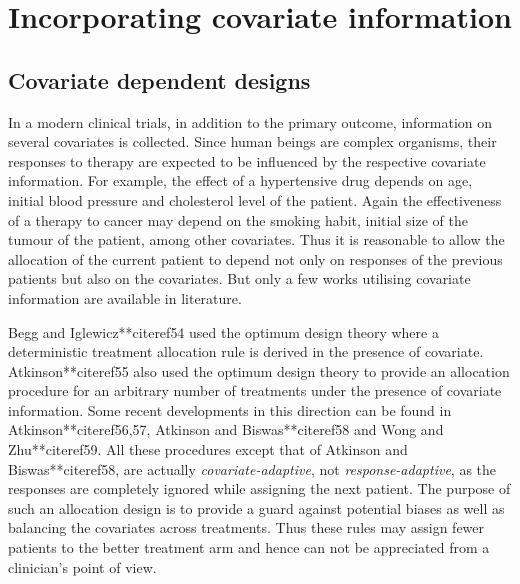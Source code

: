 \section{Incorporating covariate information}

\subsection{Covariate dependent designs}

In a modern clinical trials, in addition to the primary
outcome, information on several covariates is collected. Since human
beings are complex organisms, their responses to therapy are
expected to be influenced by the respective covariate information.
For example, the effect of a hypertensive drug depends on age,
initial blood pressure and cholesterol level of the patient. Again
the effectiveness of a therapy to cancer may depend on the smoking
habit, initial size of the tumour of the patient, among other covariates. Thus it is reasonable to allow the allocation
of the current patient to depend not only on responses of the
previous patients but also on the covariates. But only a few works
utilising covariate information are available in literature.

Begg and Iglewicz**citeref{54} used the optimum design theory where a deterministic treatment allocation rule is derived in the
presence of covariate. Atkinson**citeref{55} also used the optimum design
theory to provide an allocation procedure for an arbitrary number of
treatments under the presence of covariate information. Some recent
developments in this direction can be found in Atkinson**citeref{56,57}, Atkinson and Biswas**citeref{58} and Wong and Zhu**citeref{59}. All these procedures except that of Atkinson and Biswas**citeref{58}, are actually \textit{covariate-adaptive}, not \textit{response-adaptive}, as
the responses are completely ignored while assigning the next
patient. The purpose of such an allocation design is to provide a
guard against potential biases as well as balancing the covariates
across treatments. Thus these rules may assign fewer patients to the
better treatment arm and hence can not be appreciated from a
clinician's point of view.

